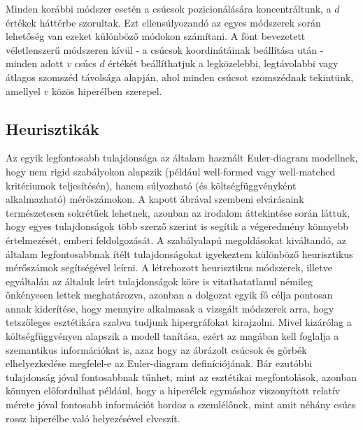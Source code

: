 Minden korábbi módszer esetén a csúcsok pozicionálására koncentráltunk, a $d$ értékek háttérbe szorultak. Ezt ellensúlyozandó az egyes módszerek során lehetőség van ezeket különböző módokon számítani. A fönt bevezetett véletlenszerű módszeren kívül - a csúcsok koordinátáinak beállítása után - minden adott $v$ csúcs $d$ értékét beállíthatjuk a legközelebbi, legtávolabbi vagy átlagos szomszéd távolsága alapján, ahol minden csúcsot szomszédnak tekintünk, amellyel $v$ közös hiperélben szerepel.





\subsection{Heurisztikák} \label{heuristics}

Az egyik legfontosabb tulajdonsága az általam használt Euler-diagram modellnek, hogy nem rigid szabályokon alapszik (például well-formed vagy well-matched kritériumok teljesítésén), hanem súlyozható (és költségfüggvényként alkalmazható) mérőszámokon. A kapott ábrával szembeni elvárásaink természetesen sokrétűek lehetnek, azonban az irodalom áttekintése során láttuk, hogy egyes tulajdonságok több szerző szerint is segítik a végeredmény könnyebb értelmezését, emberi feldolgozását. A szabályalapú megoldásokat kiváltandó, az általam legfontosabbnak ítélt tulajdonságokat igyekeztem különböző heurisztikus mérőszámok segítségével leírni. A létrehozott heurisztikus módszerek, illetve egyáltalán az általuk leírt tulajdonságok köre is vitathatatlanul némileg önkényesen lettek meghatározva, azonban a dolgozat egyik fő célja pontosan annak kiderítése, hogy mennyire alkalmasak a vizsgált módszerek arra, hogy tetszőleges esztétikára szabva tudjunk hipergráfokat kirajzolni. Mivel kizárólag a költségfüggvényen alapszik a modell tanítása, ezért az magában kell foglalja a szemantikus információkat is, azaz hogy az ábrázolt csúcsok és görbék elhelyezkedése megfelel-e az Euler-diagram definíciójának. Bár ezutóbbi tulajdonság jóval fontosabbnak tűnhet, mint az esztétikai megfontolások, azonban könnyen előfordulhat például, hogy a hiperélek egymáshoz viszonyított relatív mérete jóval fontosabb információt hordoz a szemlélőnek, mint amit néhány csúcs rossz hiperélbe való helyezésével elveszít.

